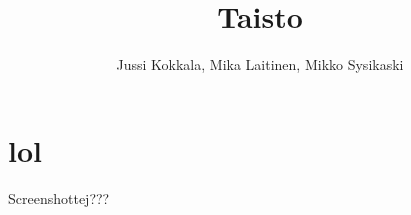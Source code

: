 \documentclass[a4paper,11pt]{article}
\title{Taisto}
\author{Jussi Kokkala, Mika Laitinen, Mikko Sysikaski}
\date{ }
\begin{document}
\maketitle
\section*{lol}
Screenshottej???
\end{document}
